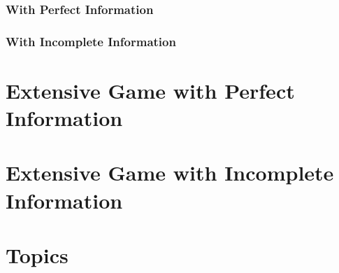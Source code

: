 \documentclass{myNotes}
\begin{document}
\section{With Perfect Information}



\section{With Incomplete Information}


\part{Extensive Game with Perfect Information}


\part{Extensive Game with Incomplete Information}

\part{Topics}

\end{document}
